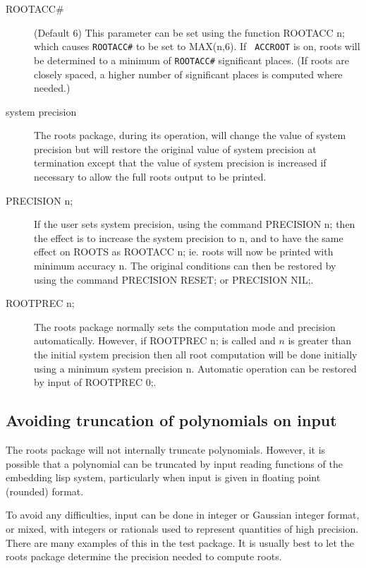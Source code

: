 \begin{description}                 
\item[ROOTACC\#] (Default 6) This parameter can be set using the function
ROOTACC n; which causes {\tt ROOTACC\#} to be set to MAX(n,6).  If {\tt
ACCROOT} is on, roots will be determined to a minimum of {\tt ROOT\-ACC\#}
significant places. (If roots are closely spaced, a higher number of
significant places is computed where needed.)

\item[system precision] The roots package, during its operation, will
change the value of system precision but will restore the original value
of system precision at termination except that the value of system
precision is increased if necessary to allow the full roots output to be
printed.

\item[PRECISION n;] If the user sets system precision, using the command
PRECISION n; then the effect is to increase the system precision to n, and
to have the same effect on ROOTS as ROOTACC n; ie. roots will now be
printed with minimum accuracy n.  The original conditions can then be
restored by using the command PRECISION RESET; or PRECISION NIL;.

\item[ROOTPREC n;] The roots package normally sets the computation mode and
precision automatically.  However, if ROOTPREC n; is
called and $n$ is greater than the initial system precision then all root
computation will be done initially using a minimum system precision n.
Automatic operation can be restored by input of ROOTPREC 0;.
\end{description}


\subsection{Avoiding truncation of polynomials on input}

The roots package will not internally truncate polynomials.  However, it
is possible that a polynomial can be truncated by input reading functions
of the embedding lisp system, particularly when input is given in floating
point (rounded) format.

To avoid any difficulties, input can be done in integer or Gaussian
integer format, or mixed, with integers or rationals used to represent
quantities of high precision. There are many examples of this in the
test package.  It is usually best to let the roots package
determine the precision needed to compute roots.

